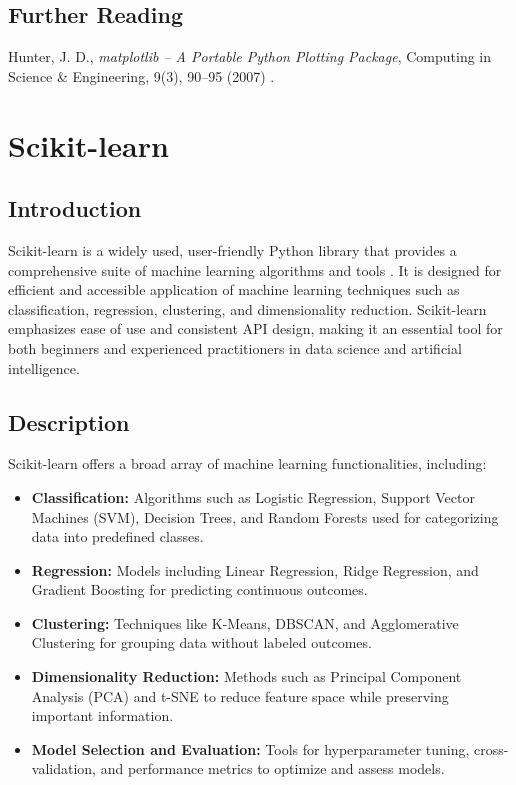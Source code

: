 \subsection{Further Reading}
Hunter, J. D., \textit{matplotlib – A Portable Python Plotting Package}, Computing in Science \& Engineering, 9(3), 90–95 (2007) \cite{hunter2007matplotlib}.


\section{Scikit-learn}

\subsection{Introduction}
Scikit-learn is a widely used, user-friendly Python library that provides a comprehensive suite of machine learning algorithms and tools \cite{pedregosa2011scikitlearn}. It is designed for efficient and accessible application of machine learning techniques such as classification, regression, clustering, and dimensionality reduction. Scikit-learn emphasizes ease of use and consistent API design, making it an essential tool for both beginners and experienced practitioners in data science and artificial intelligence.

\subsection{Description}
Scikit-learn offers a broad array of machine learning functionalities, including:

\begin{itemize}
	\item \textbf{Classification:} Algorithms such as Logistic Regression, Support Vector Machines (SVM), Decision Trees, and Random Forests used for categorizing data into predefined classes.
	\item \textbf{Regression:} Models including Linear Regression, Ridge Regression, and Gradient Boosting for predicting continuous outcomes.
	\item \textbf{Clustering:} Techniques like K-Means, DBSCAN, and Agglomerative Clustering for grouping data without labeled outcomes.
	\item \textbf{Dimensionality Reduction:} Methods such as Principal Component Analysis (PCA) and t-SNE to reduce feature space while preserving important information.
	\item \textbf{Model Selection and Evaluation:} Tools for hyperparameter tuning, cross-validation, and performance metrics to optimize and assess models.
\end{itemize}


